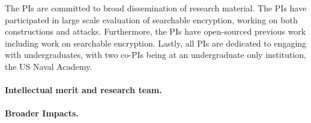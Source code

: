 The PIs are committed to broad dissemination of research material.  The PIs
have participated in large scale evaluation of searchable encryption, working
on both constructions and attacks.  Furthermore, the PIs have open-sourced
previous work including work on searchable encryption.  Lastly, all PIs are
dedicated to engaging with undergraduates, with two co-PIs being at an
undergraduate only institution, the US Naval Academy.  



\paragraph*{Intellectual merit and research team.}  

 \paragraph*{Broader Impacts.}


